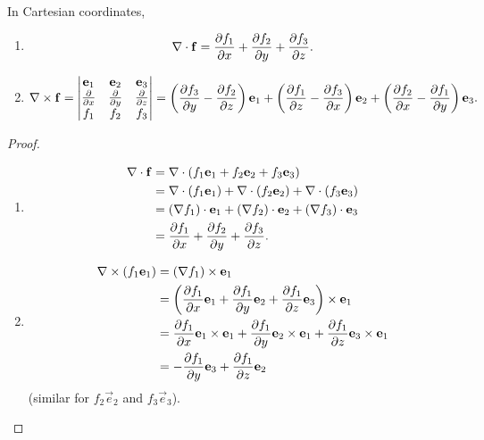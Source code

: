 \documentclass[10pt, a4paper]{article}
\begin{document}
\begin{proposition}
    In Cartesian coordinates,
    \begin{enumerate}[label = (\roman*)]
        \item
        \[
        \bnabla \cdot \vec{f} = \pd[f_1]{x} + \pd[f_2]{y} + \pd[f_3]{z}.
        \]

        \item
        \[
        \bnabla \times \vec{f} = \begin{vmatrix}
            \vec{e}_1 & \vec{e}_2 & \vec{e}_3 \\
            \pd{x} & \pd{y} & \pd{z} \\
            f_1 & f_2 & f_3
        \end{vmatrix} = \left(\pd[f_3]{y} - \pd[f_2]{z}\right)\vec{e}_1 + \left(\pd[f_1]{z} - \pd[f_3]{x}\right)\vec{e}_2 +\left(\pd[f_2]{x} - \pd[f_1]{y}\right)\vec{e}_3.
        \]
    \end{enumerate}

    \begin{proof}
        \begin{enumerate}[label = (\roman*)]
            \item
            \begin{align*}
                \bnabla \cdot \vec{f} &= \bnabla \cdot (f_1\vec{e}_1 + f_2\vec{e}_2 + f_3\vec{e}_3) \\
                &= \bnabla \cdot (f_1\vec{e}_1) + \bnabla \cdot (f_2\vec{e}_2) + \bnabla \cdot (f_3\vec{e}_3) \\
                &= (\bnabla f_1) \cdot \vec{e}_1 + (\bnabla f_2) \cdot \vec{e}_2 + (\bnabla f_3)\cdot \vec{e}_3 \\
                &= \pd[f_1]{x} + \pd[f_2]{y} + \pd[f_3]{z}.
            \end{align*}

            \item
            \begin{align*}
                \bnabla \times (f_1\vec{e}_1) &= (\bnabla f_1)\times \vec{e}_1 \\
                &= \left(\pd[f_1]{x}\vec{e}_1 + \pd[f_1]{y}\vec{e}_2 + \pd[f_1]{z}\vec{e}_3\right) \times \vec{e}_1 \\
                &= \pd[f_1]{x}\vec{e}_1 \times \vec{e}_1 + \pd[f_1]{y}\vec{e}_2 \times \vec{e}_1 + \pd[f_1]{z}\vec{e}_3 \times \vec{e}_1 \\
                &= -\pd[f_1]{y}\vec{e}_3 + \pd[f_1]{z}\vec{e}_2
            \end{align*}
            (similar for $f_2\vec{e}_2$ and $f_3\vec{e}_3$).
        \end{enumerate}
    \end{proof}
\end{proposition}
\end{document}
